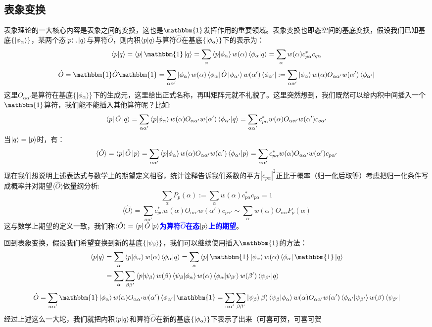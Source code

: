 \subsection{表象变换}
表象理论的一大核心内容是表象之间的变换，这也是$\mathbbm{1}$发挥作用的重要领域。表象变换也即态空间的基底变换，假设我们已知基底$\{\ket{\phi_{\alpha}}\}$，某两个态$\ket{p},\ket{q}$与算符$\hat{O}$，则内积$\bra{p}\ket{q}$与算符$\hat{O}$在基底$\{\ket{\phi_{\alpha}}\}$下的表示为：
\[\bra{p}\ket{q}=\bra{p}\mathbbm{1}\ket{q}=\sum_{\alpha}\bra{p}\ket{\phi_{\alpha}}w(\alpha)\bra{\phi_{\alpha}}\ket{q}=\sum_{\alpha}w(\alpha)c_{p\alpha}^*c_{q\alpha}\]
\[\hat{O}=\mathbbm{1}\hat{O}\mathbbm{1}=\sum_{\alpha\alpha'}\ket{\phi_{\alpha}}w(\alpha)\bra{\phi_{\alpha}}\hat{O}\ket{\phi_{\alpha'}}w(\alpha')\bra{\phi_{\alpha'}}:=\sum_{\alpha\alpha'}\ket{\phi_{\alpha}}w(\alpha)O_{\alpha\alpha'}w(\alpha')\bra{\phi_{\alpha'}}\]
这里$O_{\alpha\alpha'}$是算符在基底$\{\ket{\phi_{\alpha}}\}$下的生成元，这里给出正式名称，再叫矩阵元就不礼貌了。这里突然想到，我们既然可以给内积中间插入一个$\mathbbm{1}$算符，我们能不能插入其他算符呢？比如:
\[\bra{p}\hat{O}\ket{q}=\sum_{\alpha\alpha'}\bra{p}\ket{\phi_{\alpha}}w(\alpha)O_{\alpha\alpha'}w(\alpha')\bra{\phi_{\alpha'}}\ket{q}=\sum_{\alpha\alpha'}c_{p\alpha}^*w(\alpha)O_{\alpha\alpha'}w(\alpha')c_{q\alpha'}\]
当$\ket{q}=\ket{p}$时，有：
\[\langle\hat{O}\rangle=\bra{p}\hat{O}\ket{p}=\sum_{\alpha\alpha'}\bra{p}\ket{\phi_{\alpha}}w(\alpha)O_{\alpha\alpha'}w(\alpha')\bra{\phi_{\alpha'}}\ket{p}=\sum_{\alpha\alpha'}c_{p\alpha}^*w(\alpha)O_{\alpha\alpha'}w(\alpha')c_{p\alpha'}\]
现在我们想说明上述表达式与数学上的期望定义相容，统计诠释告诉我们系数的平方$|c_{p\alpha}|^2$正比于概率（归一化后取等）考虑把归一化条件写成概率并对期望$\langle\hat{O}\rangle$做量纲分析:
\[\sum_{\alpha}P_p(\alpha):=\sum_{\alpha}w(\alpha)c_{p\alpha}^*c_{p\alpha}=1\]
\[\langle\hat{O}\rangle=\sum_{\alpha\alpha'}c_{p\alpha}^*w(\alpha)O_{\alpha\alpha'}w(\alpha')c_{p\alpha'}\sim\sum_{\alpha}w(\alpha)O_{\alpha\alpha}P_p(\alpha)\]
这与数学上期望的定义一致，我们称\textcolor{blue}{\textbf{$\langle\hat{O}\rangle=\bra{p}\hat{O}\ket{p}$为算符$\hat{O}$在态$\ket{p}$上的期望}}。

回到表象变换，假设我们希望变换到新的基底$\{\ket{\psi_{\beta}}\}$，我们可以继续使用插入$\mathbbm{1}$的方法：
\[\begin{aligned}
\bra{p}\ket{q}&=\sum_{\alpha}\bra{p}\ket{\phi_{\alpha}}w(\alpha)\bra{\phi_{\alpha}}\ket{q}=\sum_{\alpha}\bra{p}\mathbbm{1}\ket{\phi_{\alpha}}w(\alpha)\bra{\phi_{\alpha}}\mathbbm{1}\ket{q}\\
&=\sum_{\alpha}\sum_{\beta\beta'}\bra{p}\ket{\psi_{\beta}}w(\beta)\bra{\psi_{\beta}}\ket{\phi_{\alpha}}w(\alpha)\bra{\phi_{\alpha}}\ket{\psi_{\beta'}}w(\beta')\bra{\psi_{\beta'}}\ket{q}
\end{aligned}\]
\[\hat{O}=\sum_{\alpha\alpha'}\mathbbm{1}\ket{\phi_{\alpha}}w(\alpha)O_{\alpha\alpha'}w(\alpha')\bra{\phi_{\alpha'}}\mathbbm{1}=\sum_{\alpha\alpha'}\sum_{\beta\beta'}\ket{\psi_{\beta}}\beta)\bra{\psi_{\beta}}\ket{\phi_{\alpha}}w(\alpha)O_{\alpha\alpha'}w(\alpha')\bra{\phi_{\alpha'}}\ket{\psi_{\beta'}}w(\beta)\bra{\psi_{\beta'}}\]
经过上述这么一大坨，我们就把内积$\bra{p}\ket{q}$和算符$\hat{O}$在新的基底$\{\ket{\phi_{\alpha}}\}$下表示了出来（可喜可贺，可喜可贺

